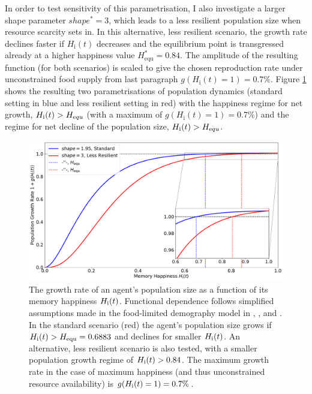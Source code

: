 In order to test sensitivity of this parametrisation, I also investigate a larger shape parameter $shape^*=3$, which leads to a less resilient population size when resource scarcity sets in.
In this alternative, less resilient scenario, the growth rate declines faster if $H_\text{i}(t)$ decreases and the equilibrium point is transgressed already at a higher happiness value $H_\text{equ}^*=0.84$.  %
The amplitude of the resulting function (for both scenarios) is scaled to give the chosen reproduction rate under unconstrained food supply from last paragraph 
$g(H_\text{i}(t)=1)=0.7\%$.
Figure \ref{fig:growthrate} shows the resulting two parametrisations of population dynamics (standard setting in blue and less resilient setting in red) with the happiness regime for net growth, $H_\text{i}(t) > H_{\text equ}$ (with a maximum of $g(H_\text{i}(t)=1)=0.7\%$) and the regime for net decline of the population size, $H_\text{i}(t) > H_{\text equ}$.
\begin{figure}
	\centering
	\includegraphics[width=\textwidth]{images/populationchange_g}
	\caption{The growth rate of an agent's population size as a function of its memory happiness $H_{\rm i}(t)$. Functional dependence follows simplified assumptions made in the food-limited demography model in \citet{Lee2008}, \citet{Puleston2008}, and \citet{Puleston2017}. In the standard scenario (red) the agent's population size grows if $H_{\rm i}(t)>H_{\rm equ}=0.6883$ and declines for smaller $H_{\rm i}(t)$. An alternative, less resilient scenario is also tested, with a smaller population growth regime of $H_{\rm i}(t)>0.84$. The maximum growth rate in the case of maximum happiness (and thus unconstrained resource availability) is $g(H_{\rm i}(t)=1)=0.7\%$.}
	\label{fig:growthrate}
\end{figure}

